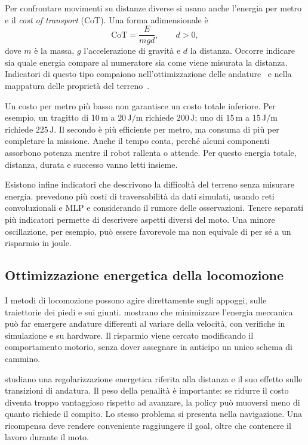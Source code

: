 Per confrontare movimenti su distanze diverse si usano anche l'energia per metro e il \emph{cost of transport} (CoT). Una forma adimensionale è
\begin{equation}
    \mathrm{CoT}=\frac{E}{m g d},\qquad d>0,
    \label{eq:sota-cot}
\end{equation}
dove $m$ è la massa, $g$ l'accelerazione di gravità e $d$ la distanza. Occorre indicare sia quale energia compare al numeratore sia come viene misurata la distanza. Indicatori di questo tipo compaiono nell'ottimizzazione delle andature~\citep{Fu2022Gaits,Liang2025AdaptiveEnergy} e nella mappatura delle proprietà del terreno~\citep{SanchezDelgado2025Mapping}.

Un costo per metro più basso non garantisce un costo totale inferiore. Per esempio, un tragitto di $10\,\mathrm{m}$ a $20\,\mathrm{J/m}$ richiede $200\,\mathrm{J}$; uno di $15\,\mathrm{m}$ a $15\,\mathrm{J/m}$ richiede $225\,\mathrm{J}$. Il secondo è più efficiente per metro, ma consuma di più per completare la missione. Anche il tempo conta, perché alcuni componenti assorbono potenza mentre il robot rallenta o attende. Per questo energia totale, distanza, durata e successo vanno letti insieme.

Esistono infine indicatori che descrivono la difficoltà del terreno senza misurare energia. \citet{Muhamad2024MultipleCosts} prevedono più costi di traversabilità da dati simulati, usando reti convoluzionali e MLP e considerando il rumore delle osservazioni. Tenere separati più indicatori permette di descrivere aspetti diversi del moto. Una minore oscillazione, per esempio, può essere favorevole ma non equivale di per sé a un risparmio in joule.

\subsection{Ottimizzazione energetica della locomozione}

I metodi di locomozione possono agire direttamente sugli appoggi, sulle traiettorie dei piedi e sui giunti. \citet{Fu2022Gaits} mostrano che minimizzare l'energia meccanica può far emergere andature differenti al variare della velocità, con verifiche in simulazione e su hardware. Il risparmio viene cercato modificando il comportamento motorio, senza dover assegnare in anticipo un unico schema di cammino.

\citet{Liang2025AdaptiveEnergy} studiano una regolarizzazione energetica riferita alla distanza e il suo effetto sulle transizioni di andatura. Il peso della penalità è importante: se ridurre il costo diventa troppo vantaggioso rispetto ad avanzare, la policy può muoversi meno di quanto richiede il compito. Lo stesso problema si presenta nella navigazione. Una ricompensa deve rendere conveniente raggiungere il goal, oltre che contenere il lavoro durante il moto.

